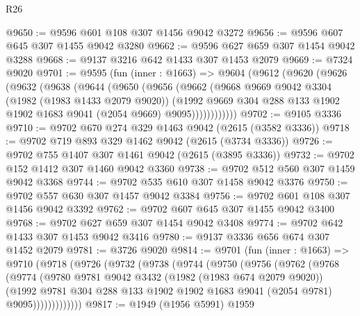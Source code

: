 \begin{lexlean}{R26}
\begin{coremodule}
@9650 := @9596 @601 @108 @307 @1456 @9042 @3272
@9656 := @9596 @607 @645 @307 @1455 @9042 @3280
@9662 := @9596 @627 @659 @307 @1454 @9042 @3288
@9668 := @9137 @3216 @642 @1433 @307 @1453 @2079
@9669 := @7324 @9020
@9701 := @9595
    (fun (inner : @1663) =>
    @9604
      (@9612
        (@9620
          (@9626
            (@9632
              (@9638
                (@9644
                  (@9650
                    (@9656
                      (@9662
                        (@9668
                          @9669
                          @9042
                          @3304
                          (@1982 (@1983 @1433 @2079 @9020))
                          (@1992
                            @9669
                            @304
                            @288
                            @133
                            @1902
                            @1902
                            @1683
                            @9041
                            (@2054 @9669)
                            @9095))))))))))))
@9702 := @9105 @3336
@9710 := @9702 @670 @274 @329 @1463 @9042 (@2615 (@3582 @3336))
@9718 := @9702 @719 @893 @329 @1462 @9042 (@2615 (@3734 @3336))
@9726 := @9702 @755 @1407 @307 @1461 @9042 (@2615 (@3895 @3336))
@9732 := @9702 @152 @1412 @307 @1460 @9042 @3360
@9738 := @9702 @512 @560 @307 @1459 @9042 @3368
@9744 := @9702 @535 @610 @307 @1458 @9042 @3376
@9750 := @9702 @557 @630 @307 @1457 @9042 @3384
@9756 := @9702 @601 @108 @307 @1456 @9042 @3392
@9762 := @9702 @607 @645 @307 @1455 @9042 @3400
@9768 := @9702 @627 @659 @307 @1454 @9042 @3408
@9774 := @9702 @642 @1433 @307 @1453 @9042 @3416
@9780 := @9137 @3336 @656 @674 @307 @1452 @2079
@9781 := @3726 @9020
@9814 := @9701
    (fun (inner : @1663) =>
    @9710
      (@9718
        (@9726
          (@9732
            (@9738
              (@9744
                (@9750
                  (@9756
                    (@9762
                      (@9768
                        (@9774
                          (@9780
                            @9781
                            @9042
                            @3432
                            (@1982 (@1983 @674 @2079 @9020))
                            (@1992
                              @9781
                              @304
                              @288
                              @133
                              @1902
                              @1902
                              @1683
                              @9041
                              (@2054 @9781)
                              @9095)))))))))))))
@9817 := @1949 (@1956 @5991) @1959

\end{coremodule}
\end{lexlean}
